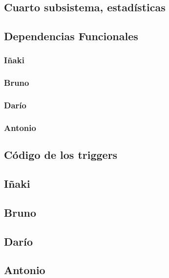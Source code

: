 \documentclass[a4paper, 11pt]{article}
\begin{document}
\subsection{Cuarto subsistema, estadísticas}




\newpage
\subsection{Dependencias Funcionales}
\begin{itemize}
	\subsubsection{Iñaki}

\subsubsection{Bruno}

\subsubsection{Darío}

\subsubsection{Antonio}

\end{itemize}

\newpage
\subsection{Código de los triggers}
\subsection{Iñaki}

\subsection{Bruno}

\subsection{Darío}

\subsection{Antonio}

\end{document}
